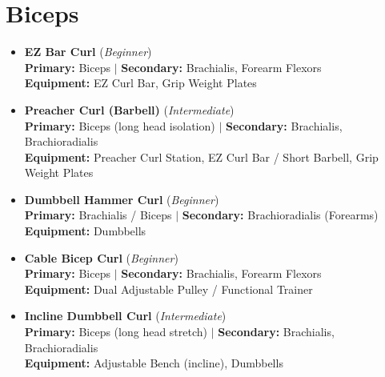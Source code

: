 \documentclass[11pt,a4paper]{article}
\begin{document}
\section*{Biceps}
\begin{itemize}[leftmargin=*]
  \item \textbf{EZ Bar Curl} (\textit{Beginner})\\
        \textbf{Primary:} Biceps $|$ \textbf{Secondary:} Brachialis, Forearm Flexors\\
        \textbf{Equipment:} EZ Curl Bar, Grip Weight Plates
  \item \textbf{Preacher Curl (Barbell)} (\textit{Intermediate})\\
        \textbf{Primary:} Biceps (long head isolation) $|$ \textbf{Secondary:} Brachialis, Brachioradialis\\
        \textbf{Equipment:} Preacher Curl Station, EZ Curl Bar / Short Barbell, Grip Weight Plates
  \item \textbf{Dumbbell Hammer Curl} (\textit{Beginner})\\
        \textbf{Primary:} Brachialis / Biceps $|$ \textbf{Secondary:} Brachioradialis (Forearms)\\
        \textbf{Equipment:} Dumbbells
  \item \textbf{Cable Bicep Curl} (\textit{Beginner})\\
        \textbf{Primary:} Biceps $|$ \textbf{Secondary:} Brachialis, Forearm Flexors\\
        \textbf{Equipment:} Dual Adjustable Pulley / Functional Trainer
  \item \textbf{Incline Dumbbell Curl} (\textit{Intermediate})\\
        \textbf{Primary:} Biceps (long head stretch) $|$ \textbf{Secondary:} Brachialis, Brachioradialis\\
        \textbf{Equipment:} Adjustable Bench (incline), Dumbbells
\end{itemize}
\vspace{0.5em}
\end{document}
